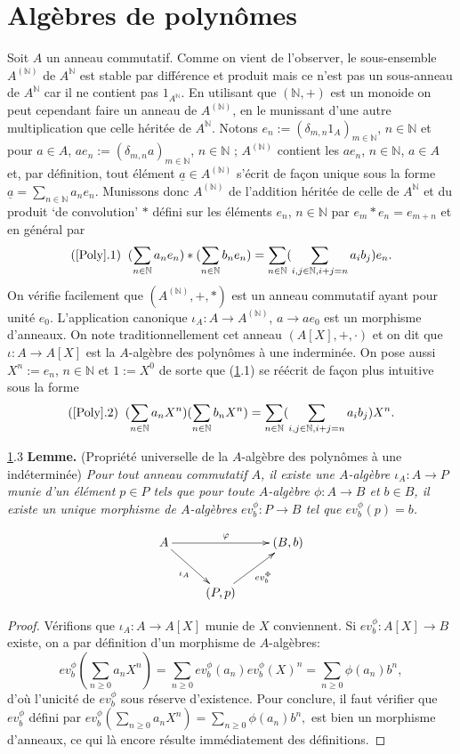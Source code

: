 \documentclass[a4paper, oneside, 12pt]{book}
\theoremstyle{definition} %
\newcommand{\N}{\mathbb{N}}
\begin{document}
\section{Algèbres de polynômes}\label{Poly}Soit $A$ un anneau commutatif.   
Comme on vient de l'observer, le sous-ensemble $A^{(\N)}$ de $ A^\N$ est stable par différence et produit mais ce n'est pas un sous-anneau de $A^\N$ car il ne contient pas $1_{A^\N}$. En utilisant que $(\N,+)$ est un monoide on peut cependant    faire un anneau de $A^{(\N)}$, en le munissant d'une autre multiplication que celle héritée de $A^{\N}$. Notons  $e_n:=(\delta_{m,n}1_{A})_{m\in \N}$, $n\in \N$ et pour $a\in A$, $ae_n:=(\delta_{m,n}a)_{m\in \N}$, $n\in \N$ ; $A^{(\N)}$ contient les $ae_n$, $n\in \N$, $a\in A$ et, par définition,  tout élément $\underline{a}\in A^{(\N)}$ s'écrit de fa\c{c}on unique sous la forme $\underline{a}=\sum_{n\in \N}a_ne_n$. Munissons donc $A^{(\N)}$ de l'addition héritée de celle de $A^\N$ et du produit `de convolution' $*$ défini sur les éléments $e_n$, $n\in \N$ par 
$e_m*e_n=e_{m+n} $ et en général par
$$(\ref{Poly}.1)\;\; (\sum_{n\in\N}a_ne_n) *(\sum_{n\in \N}b_ne_n)=\sum_{n\in \N}(\sum_{i,j\in \N, i+j=n}a_ib_j)e_n.$$
On vérifie facilement que $(A^{(\N)},+,*)$ est un anneau commutatif ayant pour unité $e_0$. L'application canonique $\iota_A:A\rightarrow A^{(\N)}$, $a\rightarrow ae_0  $  est un morphisme d'anneaux.
 On note traditionnellement cet anneau $(A[X],+,\cdot)$ et on dit que $\iota:A\rightarrow A[X]$ est la $A$-algèbre des polynômes à une inderminée. On pose aussi $X^n:=e_n$, $n\in \N$ et $1:=X^0$ de sorte que (\ref{Poly}.1) se réécrit de fa\c{c}on plus intuitive sous la forme
 $$(\ref{Poly}.2)\;\; (\sum_{n\in\N}a_nX^n)(\sum_{n\in \N}b_nX^n)=\sum_{n\in \N}(\sum_{i,j\in \N, i+j=n}a_ib_j)X^n.$$
 
 \ref{Poly}.3 \textbf{Lemme.} (Propriété universelle de la $A$-algèbre des polynômes à une indéterminée) \textit{Pour tout anneau commutatif $A$, il existe une $A$-algèbre $\iota_A: A\rightarrow P$ munie d'un élément $p\in P$ tels que pour toute $A$-algèbre $\phi: A\rightarrow B$ et  $b\in B$, il existe un unique  morphisme de $A$-algèbres $ev^\phi_b:P\rightarrow B$  tel que $ ev^\phi_b(p)=b$. }

	$$ \xymatrix{A \ar[rd]_{\iota_A} \ar[rr]^\varphi && (B, b) \\ & (P, p) \ar[ru]_{ev_b^\Phi}} $$

\begin{proof} Vérifions que $\iota_A:A\rightarrow A[X]$ munie de $X$ conviennent. Si $ev_b^\phi:A[X]\rightarrow B$ existe,  on a par définition d'un morphisme de $A$-algèbres:
$$ev^\phi_b(\sum_{n\geq 0}a_nX^n)=\sum_{n\geq 0}ev_b^\phi(a_n)ev_b^\phi(X)^n=\sum_{n\geq 0}\phi(a_n)b^n,$$
d'où l'unicité de $ev_b^\phi$ sous réserve d'existence.  Pour conclure, il faut vérifier que $ev_b^\phi$ défini par  $ev^\phi_b(\sum_{n\geq 0}a_nX^n)= \sum_{n\geq 0}\phi(a_n)b^n,$ est bien un morphisme d'anneaux, ce qui là encore résulte immédiatement des définitions.
\end{proof}
\end{document}
